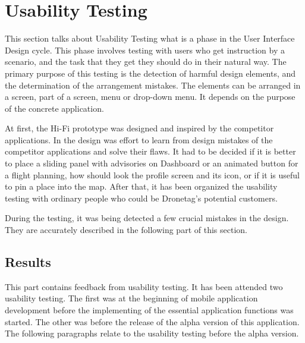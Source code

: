 \section{Usability Testing}\label{sec:usability-testing}

This section talks about Usability Testing what is a phase in the User Interface Design cycle.
This phase involves testing with users who get instruction by a scenario, and the task that they get they should do in their natural way.
The primary purpose of this testing is the detection of harmful design elements, and the determination of the arrangement mistakes.
The elements can be arranged in a screen, part of a screen, menu or drop-down menu.
It depends on the purpose of the concrete application.

At first, the Hi-Fi prototype was designed and inspired by the competitor applications.
In the design was effort to learn from design mistakes of the competitor applications and solve their flaws.
It had to be decided if it is better to place a sliding panel with advisories on Dashboard or an animated button for a flight planning, how should look the profile screen and its icon, or if it is useful to pin a place into the map.
After that, it has been organized the usability testing with ordinary people who could be Dronetag's potential customers.

During the testing, it was being detected a few crucial mistakes in the design.
They are accurately described in the following part of this section.

\subsection{Results}\label{subsec:results}
This part contains feedback from usability testing.
It has been attended two usability testing.
The first was at the beginning of mobile application development before the implementing of the essential application functions was started.
The other was before the release of the alpha version of this application.
The following paragraphs relate to the usability testing before the alpha version.

